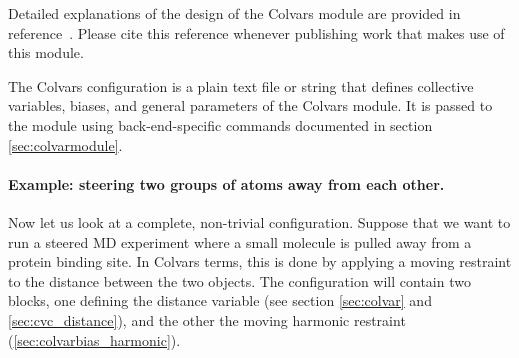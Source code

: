 Detailed explanations of the design of the Colvars module are provided in reference~\cite{Fiorin2013}. Please cite this reference whenever publishing work that makes use of this module.




The Colvars configuration is a plain text file or string that defines collective variables, biases, and general parameters of the Colvars module.
It is passed to the module using back-end-specific commands documented in section \ref{sec:colvarmodule}.


\paragraph*{Example: steering two groups of atoms away from each other.}

Now let us look at a complete, non-trivial configuration.
Suppose that we want to run a steered MD experiment where a small molecule is pulled away from a protein binding site.
In Colvars terms, this is done by applying a moving restraint to the distance between the two objects.
The configuration will contain two blocks, one defining the distance variable (see section \ref{sec:colvar} and \ref{sec:cvc_distance}), and the other the moving harmonic restraint (\ref{sec:colvarbias_harmonic}).

